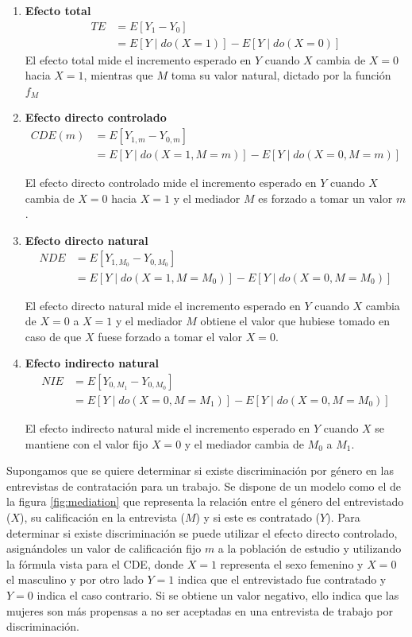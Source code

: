 \begin{enumerate}
	\item \textbf{Efecto total}
	\begin{align*}
		TE &= E[Y_1 - Y_0]\\
		&=E[Y \mid do(X=1)] - E[Y \mid do(X=0)]
	\end{align*}
	El efecto total mide el incremento esperado en $Y$ cuando $X$ cambia de $X=0$ hacia $X=1$, mientras que $M$ toma su valor natural, dictado por la función $f_M$
	
	\item \textbf{Efecto directo controlado}
	\begin{align*}
		CDE(m)
		&=E[Y_{1,m} - Y_{0,m}] \\
		&=E[Y \mid do(X=1,M=m)] - E[Y \mid do(X=0,M=m)]
	\end{align*}
	
	El efecto directo controlado mide el incremento esperado en $Y$ cuando $X$ cambia de $X=0$ hacia $X=1$ y el mediador $M$ es forzado a tomar un valor $m$.
	
	\item \textbf{Efecto directo natural}
	\begin{align*}
		NDE
		&=E[Y_{1,M_0} - Y_{0,M_0}] \\
		&=E[Y \mid do(X=1,M=M_0)] - E[Y \mid do(X=0,M=M_0)]
	\end{align*}
	
	El efecto directo natural mide el incremento esperado en $Y$ cuando $X$ cambia de $X=0$ a $X=1$ y el mediador $M$ obtiene el valor que hubiese tomado en caso de que $X$ fuese forzado a tomar el valor $X=0$.
	
	\item \textbf{Efecto indirecto natural}
	\begin{align*}
		NIE
		&=E[Y_{0,M_1} - Y_{0,M_0}] \\
		&=E[Y \mid do(X=0,M=M_1)] - E[Y \mid do(X=0,M=M_0)]
	\end{align*}
	
	El efecto indirecto natural mide el incremento esperado en $Y$ cuando $X$ se mantiene con el valor fijo $X=0$ y el mediador cambia de $M_0$ a $M_1$.
\end{enumerate}

Supongamos que se quiere determinar si existe discriminación por género en las entrevistas de contratación para un trabajo. Se dispone de un modelo como el de la figura \ref{fig:mediation} que representa la relación entre el género del entrevistado ($X$), su calificación en la entrevista ($M$) y si este es contratado ($Y$). Para determinar si existe discriminación se puede utilizar el efecto directo controlado, asignándoles un valor de calificación fijo $m$ a la población de estudio y utilizando la fórmula vista para el CDE, donde $X=1$ representa el sexo femenino y $X=0$ el masculino y por otro lado $Y=1$ indica que el entrevistado fue contratado y $Y=0$ indica el caso contrario. Si se obtiene un valor negativo, ello indica que las mujeres son más propensas a no ser aceptadas en una entrevista de trabajo por discriminación.
